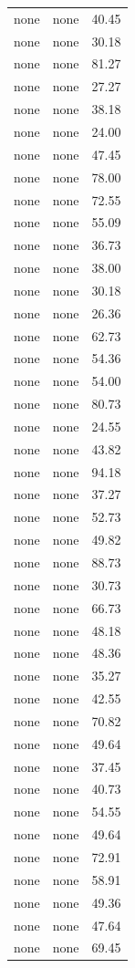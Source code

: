 \begin{tabular}{rrr}
none & none & 40.45 \\
none & none & 30.18 \\
none & none & 81.27 \\
none & none & 27.27 \\
none & none & 38.18 \\
none & none & 24.00 \\
none & none & 47.45 \\
none & none & 78.00 \\
none & none & 72.55 \\
none & none & 55.09 \\
none & none & 36.73 \\
none & none & 38.00 \\
none & none & 30.18 \\
none & none & 26.36 \\
none & none & 62.73 \\
none & none & 54.36 \\
none & none & 54.00 \\
none & none & 80.73 \\
none & none & 24.55 \\
none & none & 43.82 \\
none & none & 94.18 \\
none & none & 37.27 \\
none & none & 52.73 \\
none & none & 49.82 \\
none & none & 88.73 \\
none & none & 30.73 \\
none & none & 66.73 \\
none & none & 48.18 \\
none & none & 48.36 \\
none & none & 35.27 \\
none & none & 42.55 \\
none & none & 70.82 \\
none & none & 49.64 \\
none & none & 37.45 \\
none & none & 40.73 \\
none & none & 54.55 \\
none & none & 49.64 \\
none & none & 72.91 \\
none & none & 58.91 \\
none & none & 49.36 \\
none & none & 47.64 \\
none & none & 69.45 \\

\end{tabular}
